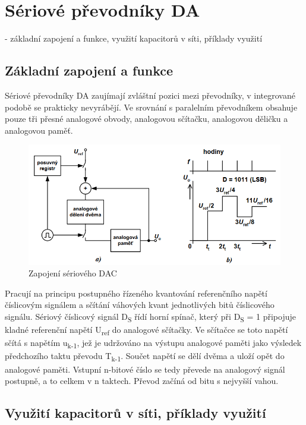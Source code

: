 \section{Sériové převodníky DA}
- základní zapojení a funkce, využití kapacitorů v síti, příklady využití

\subsection{Základní zapojení a funkce}
Sériové převodníky DA zaujímají zvláštní pozici mezi převodníky, v integrované podobě se prakticky nevyrábějí. Ve srovnání s paralelním převodníkem obsahuje pouze tři přesné analogové obvody, analogovou sčítačku, analogovou děličku a analogovou paměť.
\begin{figure}[h]
   \begin{center}
     \includegraphics[scale=0.6]{images/DAser.png}
   \end{center}
   \caption{Zapojení sériového DAC}
\end{figure}

Pracují na principu postupného řízeného kvantování referenčního napětí číslicovým
signálem a sčítání váhových kvant jednotlivých bitů číslicového signálu. Sériový číslicový signál D\textsubscript{S} řídí horní spínač, který při D\textsubscript{S} = 1 připojuje kladné referenční napětí U\textsubscript{ref} do analogové sčítačky. Ve sčítačce se toto napětí sčítá s napětím u\textsubscript{k-1}, jež je udržováno na výstupu analogové paměti jako výsledek předchozího taktu převodu T\textsubscript{k-1}. Součet napětí se dělí dvěma a uloží opět do analogové paměti. Vstupní n-bitové číslo se tedy převede na analogový signál postupně, a to celkem v n taktech. Převod začíná od bitu s nejvyšší vahou.

\subsection{Využití kapacitorů v síti, příklady využití}
